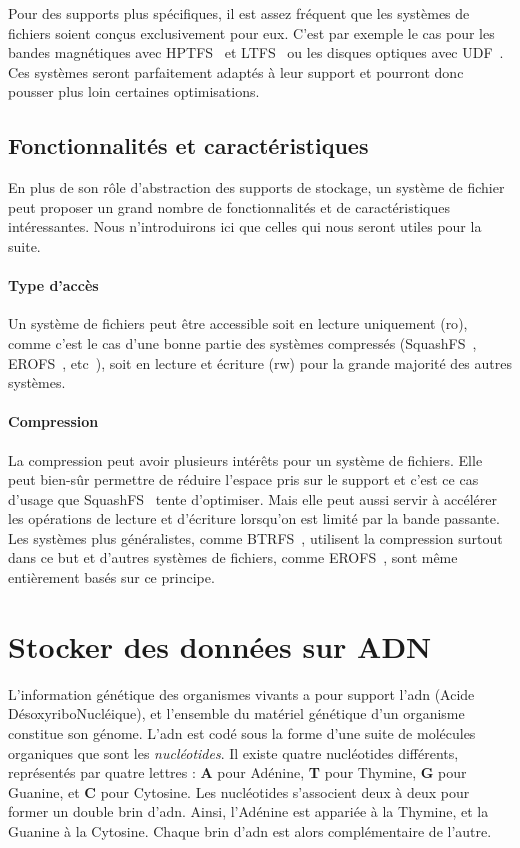 \documentclass[a4paper]{report}
\makeatletter
\newcommand{\btrfs}{BTRFS~\cite{rodeh2013btrfs}\@\xspace}
\newcommand{\erofs}{EROFS~\cite{gao2019erofs}\@\xspace}
\newcommand{\hptfs}{HPTFS~\cite{zhang2006hptfs}\@\xspace}
\newcommand{\ltfs}{LTFS~\cite{pease2010linear}\@\xspace}
\newcommand{\squashfs}{SquashFS~\cite{lougher2009squashfs}\@\xspace}
\newcommand{\udf}{UDF~\cite{optical2003universal}\@\xspace}
\makeatother
\begin{document}
Pour des supports plus spécifiques, il est assez fréquent que les systèmes de fichiers soient conçus exclusivement pour eux.
C'est par exemple le cas pour les bandes magnétiques avec \hptfs et \ltfs ou les disques optiques avec \udf.
Ces systèmes seront parfaitement adaptés à leur support et pourront donc pousser plus loin certaines optimisations.

\subsection{Fonctionnalités et caractéristiques}

En plus de son rôle d'abstraction des supports de stockage,
un système de fichier peut proposer un grand nombre de fonctionnalités et de caractéristiques intéressantes.
Nous n'introduirons ici que celles qui nous seront utiles pour la suite.

\paragraph{Type d'accès}
Un système de fichiers peut être accessible soit en lecture uniquement (\ac{ro}),
comme c'est le cas d'une bonne partie des systèmes compressés (\squashfs, \erofs, etc~\textellipsis),
soit en lecture et écriture (\ac{rw}) pour la grande majorité des autres systèmes.

\paragraph{Compression}
La compression peut avoir plusieurs intérêts pour un système de fichiers.
Elle peut bien-sûr permettre de réduire l'espace pris sur le support
et c'est ce cas d'usage que \squashfs tente d'optimiser.
Mais elle peut aussi servir à accélérer les opérations de lecture et d'écriture lorsqu'on est limité par la bande passante.
Les systèmes plus généralistes, comme \btrfs, utilisent la compression surtout dans ce but
et d'autres systèmes de fichiers, comme \erofs, sont même entièrement basés sur ce principe.


\section{Stocker des données sur ADN}

L'information génétique des organismes vivants a pour support l'\ac{adn} (Acide DésoxyriboNucléique), et l'ensemble du matériel génétique d'un organisme constitue son génome.
L'\ac{adn} est codé sous la forme d'une suite de molécules organiques que sont les \emph{nucléotides}.
Il existe quatre nucléotides différents, représentés par quatre lettres : \textbf{A} pour Adénine, \textbf{T} pour Thymine, \textbf{G} pour Guanine, et \textbf{C} pour Cytosine.
Les nucléotides s'associent deux à deux pour former un double brin d'\ac{adn}.
Ainsi, l'Adénine est appariée à la Thymine, et la Guanine à la Cytosine.
Chaque brin d'\ac{adn} est alors complémentaire de l'autre.
\end{document}
